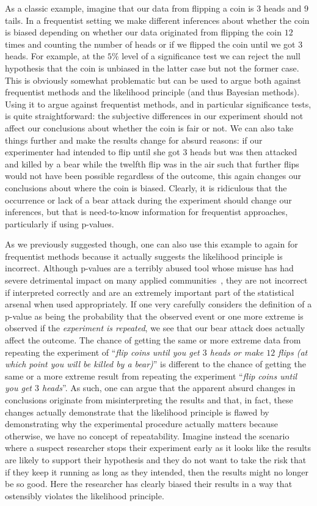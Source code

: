 As a classic example, 
imagine that our data from flipping a coin is $3$ heads and $9$ tails.
In a frequentist setting we make different inferences about whether the coin is biased 
depending on whether our data originated from flipping the coin $12$ times and counting the number of heads or if we 
flipped the coin until we got $3$ heads.  For example, at the $5\%$ level of a significance test we can reject the null
hypothesis that the coin is unbiased in the latter case but not the former case.  This is obviously somewhat problematic but
can be used to argue both against frequentist methods and the likelihood principle (and thus Bayesian methods).  Using it
to argue against frequentist methods, and in particular significance tests, is quite straightforward: the subjective
differences in our experiment should not affect our conclusions about whether the coin is fair or not.  We can also take things
further and make the results change for absurd reasons: if our experimenter had intended to flip until she got
$3$ heads but was then attacked and killed by a bear while the twelfth flip was in the air such that further flips would not
have been possible regardless of the outcome, this again changes our conclusions
about where the coin is biased.  Clearly, it is ridiculous that the occurrence or lack of a bear attack during the experiment
should change our inferences, but that is need-to-know information for frequentist approaches, particularly if using p-values.

As we previously suggested though, one can also use this example to again for frequentist methods because it actually
suggests the likelihood principle is incorrect.  Although p-values are a terribly abused tool whose misuse has had
severe detrimental impact on many applied communities~\citep{goodman1999toward,ioannidis2005most}, they are not incorrect if 
interpreted correctly
and are an extremely important part of the statistical arsenal when used appropriately.  If one very carefully considers
the definition of a p-value as being the probability that the observed event or one more extreme is observed if the
\emph{experiment is repeated}, we see that our bear attack does actually affect the outcome.  The chance of getting the same
or more extreme data from repeating the experiment of ``\textit{flip coins until you get $3$ heads or make $12$ flips (at which
	point you will be killed by a bear)}'' is different to the chance of getting the same or a more extreme result from
repeating the experiment ``\textit{flip coins until you get $3$ heads}''.  As such, one can argue that the apparent absurd
changes in conclusions originate from misinterpreting the results and that, in fact, these changes actually demonstrate
that the likelihood principle is flawed by demonstrating why the experimental procedure actually matters because otherwise,
we have no concept of repeatability.  Imagine instead the scenario where a suspect researcher stops their experiment
early as it looks like the results are likely to support their hypothesis and they do not want to take the risk that if they
keep it running as long as they intended, then the results might no longer be so good.  Here the researcher has clearly
biased their results in a way that ostensibly violates the likelihood principle.

